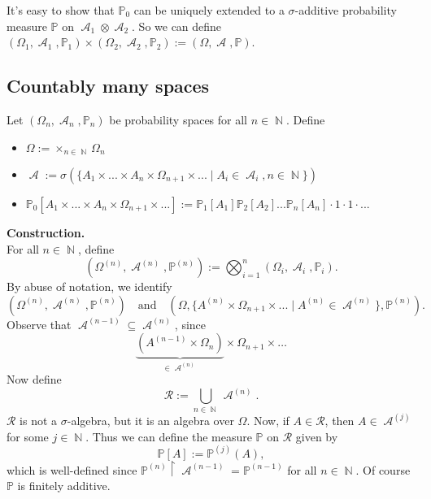 \documentclass[12pt,a4paper]{report}
\theoremstyle{definition}
\theoremstyle{num.custom-title}
\DeclareMathOperator{\A}{\mathcal{A}}
\DeclareMathOperator{\N}{\mathbb{N}}
\DeclareMathOperator{\sse}{\subseteq}
\newcommand{\RR}{\mathcal{R}}
\renewcommand{\1}{\mathbbm{1}}
\renewcommand{\P}{\mathbb{P}}
\begin{document}
It's easy to show that $\P_0$ can be uniquely extended to a $\sigma$-additive probability measure $\P$ on $\A_1 \otimes \A_2$. So we can define $(\Omega_1,\A_1,\P_1) \times (\Omega_2,\A_2,\P_2) := (\Omega,\A,\P)$.

\subsection{Countably many spaces}\label{count-prod}

Let $(\Omega_n,\A_n,\P_n)$ be probability spaces for all $n \in \N$. Define
\begin{itemize}
\item $\Omega := \times_{n \in \N} \Omega_n$
\item $\A := \sigma(\{ A_1 \times ... \times A_n \times \Omega_{n+1} \times ... \mid A_i \in \A_i, n \in \N \})$
\item $\P_0[A_1 \times ... \times A_n \times \Omega_{n+1} \times ...] := \P_1[A_1] \P_2[A_2] ... \P_n[A_n] \cdot 1 \cdot 1 \cdot ...$
\end{itemize}

\noindent\textbf{Construction.}\\
For all $n \in \N$, define
\[
(\Omega^{(n)},\A^{(n)},\P^{(n)}) := \bigotimes_{i=1}^n (\Omega_i,\A_i,\P_i).
\]
By abuse of notation, we identify 
\[
(\Omega^{(n)},\A^{(n)},\P^{(n)}) \quad \text{and} \quad (\Omega,\{A^{(n)} \times \Omega_{n+1} \times ... \mid A^{(n)} \in \A^{(n)} \}, \P^{(n)}).
\]
Observe that $\A^{(n-1)} \sse \A^{(n)}$, since
\[
\underbrace{(A^{(n-1)} \times \Omega_n)}_{\in \A^{(n)}} \times \Omega_{n+1} \times \ldots
\]
Now define
\[
\RR := \bigcup_{n \in \N} \A^{(n)}.
\]
$\RR$ is not a $\sigma$-algebra, but it is an algebra over $\Omega$. Now, if $A \in \RR$, then $A \in \A^{(j)}$ for some $j \in \N$. Thus we can define the measure $\P$ on $\RR$ given by
\[
\P[A] := \P^{(j)}(A), \tag{$*$}
\]
which is well-defined since $\P^{(n)} \upharpoonright \A^{(n-1)} = \P^{(n-1)}$ for all $n \in \N$. Of course $\P$ is finitely additive.
\end{document}
